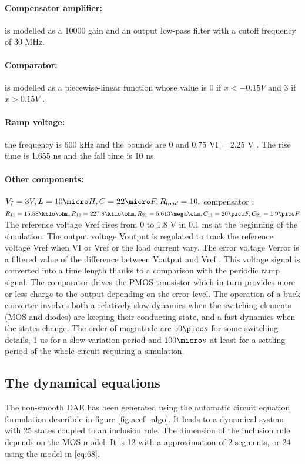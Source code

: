 \paragraph{Compensator amplifier:} is modelled as a 10000 gain and an output low-pass
filter with a cutoff frequency of 30 MHz.
\paragraph{Comparator:} is modelled as a piecewise-linear function whose value is 0 if
$x < -0.15V$ and 3 if $x > 0.15V$ .
\paragraph{Ramp voltage:} the frequency is 600 kHz and the bounds are 0 and 0.75 VI = 2.25 V .
The rise time is 1.655 ns and the fall time is 10 ns.
\paragraph{Other components:} $V_I = 3 V , L = 10 \micro H, C = 22 \micro F,R_{load} = 10,$ compensator
: $R_{11} = 15.58 \kilo \ohm , R_{12} = 227.8 \kilo \ohm ,R_{21} = 5.613 \mega \ohm, C_{11} = 20 \pico F, C_{21} =
1.9 \pico F$
The reference voltage Vref rises from 0 to 1.8 V in 0.1 ms at the beginning
of the simulation.
The output voltage Voutput is regulated to track the reference voltage Vref when
VI or Vref or the load current vary. The error voltage Verror is a filtered value
of the difference between Voutput and Vref . This voltage signal is converted
into a time length thanks to a comparison with the periodic ramp signal. The
comparator drives the PMOS transistor which in turn provides more or less
charge to the output depending on the error level. The operation of a buck
converter involves both a relatively slow dynamics when the switching elements
(MOS and diodes) are keeping their conducting state, and a fast dynamics when
the states change. The order of magnitude are $ 50 \pico s$ for some switching details,
1 us for a slow variation period and $100 \micro s$ at least for a settling period of the
whole circuit requiring a simulation.

\subsection{The dynamical equations}
\label{section41}
The non-smooth DAE has been generated using the automatic circuit equation formulation describde in figure
\ref{fig:acef_algo}. It leads to a dynamical system with 25 states coupled to an inclusion rule. The dimension of the inclusion
rule depends on the MOS model. It is 12 with a approximation of 2 segments, or 24 using the
model in \ref{eq:68}.  

